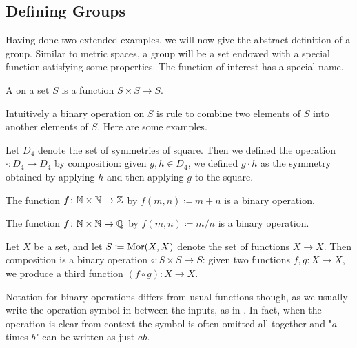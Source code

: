 \documentclass[../notes.tex]{subfiles}
\begin{document}
\subsection{Defining Groups}
Having done two extended examples, we will now give the abstract definition of a group. Similar to metric spaces, a group will be a set endowed with a special function satisfying some properties. The function of interest has a special name.
\begin{definition}
    A  on a set $S$ is a function $S \times S \to S$.
\end{definition}
Intuitively a binary operation on $S$ is rule to combine two elements of $S$ into another elements of $S$. Here are some examples.
\begin{example} \label{ex:d4-comp}
    Let $D_4$ denote the set of symmetries of square. Then we defined the operation $\cdot\colon D_4\to D_4$ by composition: given $g,h\in D_4$, we defined $g\cdot h$ as the symmetry obtained by applying $h$ and then applying $g$ to the square.
\end{example}
\begin{example} \label{ex:add-is-bin-op}
    The function $f\colon\mathbb N\times\mathbb N\to\mathbb Z$ by $f(m,n)\coloneqq m+n$ is a binary operation.
\end{example}
\begin{example}
    The function $f\colon\mathbb N\times\mathbb N\to\mathbb Q$ by $f(m,n)\coloneqq m/n$ is a binary operation.
\end{example}
\begin{example} \label{ex:comp-is-bin-op}
    Let $X$ be a set, and let $S\coloneqq\operatorname{Mor}(X,X)$ denote the set of functions $X\to X$. Then composition is a binary operation $\circ\colon S\times S\to S$: given two functions $f,g\colon X\to X$, we produce a third function $(f\circ g)\colon X\to X$.
\end{example}
Notation for binary operations differs from usual functions though, as we usually write the operation symbol in between the inputs, as in .
In fact, when the operation is clear from context the symbol is often omitted all together and "$a$ times $b$" can be written as just $ab$.
\end{document}

